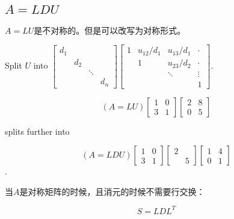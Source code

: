 \subsection{$A = LDU$}

$A=LU$是不对称的。但是可以改写为对称形式。

Split $ U $ into $ \left[\begin{array}{cccc}d_{1} & & & \\ & d_{2} & & \\ & & \ddots & \\ & & & d_{n}\end{array}\right]\left[\begin{array}{cccc}1 & u_{12} / d_{1} & u_{13} / d_{1} & \cdot \\ & 1 & u_{23} / d_{2} & \cdot \\ & & \ddots & \vdots \\ & & & 1\end{array}\right] $.

\begin{example}
    
    \begin{equation}(A= LU) \left[\begin{array}{ll}1 & 0 \\ 3 & 1\end{array}\right]\left[\begin{array}{ll}2 & 8 \\ 0 & 5\end{array}\right] \end{equation} 
    
    splits further into
    
    \begin{equation}(A= LDU) \left[\begin{array}{ll}1 & 0 \\ 3 & 1\end{array}\right]\left[\begin{array}{ll}2 & \\ & 5\end{array}\right]\left[\begin{array}{ll}1 & 4 \\ 0 & 1\end{array}\right] \end{equation}.
    
\end{example}

\begin{theorem}
    当$A$是对称矩阵的时候，且消元的时候不需要行交换：

    \begin{equation}S = LDL^T\end{equation}
\end{theorem}



